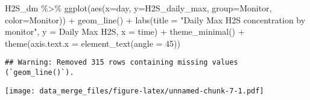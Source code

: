 \documentclass[
]{article}
\newenvironment{Shaded}{\begin{snugshade}}{\end{snugshade}}
\newcommand{\AttributeTok}[1]{\textcolor[rgb]{0.77,0.63,0.00}{#1}}
\newcommand{\DecValTok}[1]{\textcolor[rgb]{0.00,0.00,0.81}{#1}}
\newcommand{\FunctionTok}[1]{\textcolor[rgb]{0.00,0.00,0.00}{#1}}
\newcommand{\NormalTok}[1]{#1}
\newcommand{\SpecialCharTok}[1]{\textcolor[rgb]{0.00,0.00,0.00}{#1}}
\newcommand{\StringTok}[1]{\textcolor[rgb]{0.31,0.60,0.02}{#1}}
\begin{document}
\begin{Shaded}
\begin{Highlighting}[]
\NormalTok{H2S\_dm }\SpecialCharTok{\%\textgreater{}\%}
 \FunctionTok{ggplot}\NormalTok{(}\FunctionTok{aes}\NormalTok{(}\AttributeTok{x=}\NormalTok{day, }\AttributeTok{y=}\NormalTok{H2S\_daily\_max, }\AttributeTok{group=}\NormalTok{Monitor, }\AttributeTok{color=}\NormalTok{Monitor)) }\SpecialCharTok{+}
   \FunctionTok{geom\_line}\NormalTok{() }\SpecialCharTok{+}
   \FunctionTok{labs}\NormalTok{(}\AttributeTok{title =} \StringTok{"Daily Max H2S concentration by monitor"}\NormalTok{, }\AttributeTok{y =} \StringTok{\textquotesingle{}Daily Max H2S\textquotesingle{}}\NormalTok{, }\AttributeTok{x =} \StringTok{\textquotesingle{}time\textquotesingle{}}\NormalTok{) }\SpecialCharTok{+}
   \FunctionTok{theme\_minimal}\NormalTok{() }\SpecialCharTok{+}
   \FunctionTok{theme}\NormalTok{(}\AttributeTok{axis.text.x =} \FunctionTok{element\_text}\NormalTok{(}\AttributeTok{angle =} \DecValTok{45}\NormalTok{))}
\end{Highlighting}
\end{Shaded}

\begin{verbatim}
## Warning: Removed 315 rows containing missing values (`geom_line()`).
\end{verbatim}

\texttt{[image: data\_merge\_files/figure-latex/unnamed-chunk-7-1.pdf]}

\begin{Shaded}
\end{Shaded}
\end{document}
